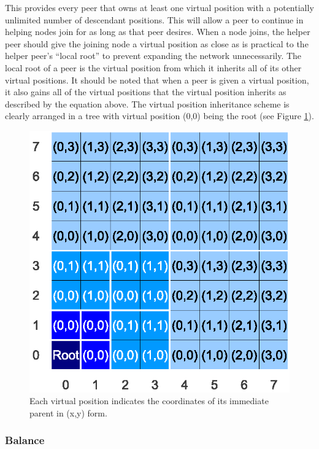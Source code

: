 \documentclass[ %
                    author={Luke Murray},
                supervisor={Dr. Simon Hollis},
                     title={Shadow Peer-to-Peer Networks},
                  subtitle={},
                    degree={MEng},
                      year={2013} ]{thesis}
\begin{document}
This provides every peer that owns at least one virtual position with a potentially unlimited number of descendant positions. This will allow a peer to continue in helping nodes join for as long as that peer desires. When a node joins, the helper peer should give the joining node a virtual position as close as is practical to the helper peer's ``local root'' to prevent expanding the network unnecessarily. The local root of a peer is the virtual position from which it inherits all of its other virtual positions. It should be noted that when a peer is given a virtual position, it also gains all of the virtual positions that the virtual position inherits as described by the equation above. The virtual position inheritance scheme is clearly arranged in a tree with virtual position (0,0) being the root (see Figure \ref{tree}).

\begin{figure}[h]
    \centering
    \includegraphics{diagrams/network_tree.eps}
    \caption{Each virtual position indicates the coordinates of its immediate parent in (x,y) form.}
    \label{tree}
\end{figure}

\subsubsection{Balance}
\end{document}
